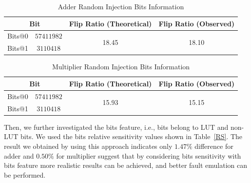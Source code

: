 \begin{table}[tb!]
\center
\caption{Adder Random Injection Bits Information}

\label{RI}

\begin{tabular}{c c  c c   } 
 \hline
\multicolumn{2}{c}{Bit}     & Flip Ratio (Theoretical) &  Flip Ratio (Observed)   \\ 
 \hline
 
 Bits@0 & $57 411 982  $ & \multirow{2}{*}{18.45} & \multirow{2}{*}{18.10} \\
 Bits@1 & $3110418$  & &\\ 
 \hline
% 

 
 
\end{tabular}
\end{table}


\begin{table}[tb!]
\center
\caption{Multiplier Random Injection Bits Information}

\label{RIM}

\begin{tabular}{c c  c c   } 
 \hline
\multicolumn{2}{c}{Bit}     & Flip Ratio (Theoretical) &  Flip Ratio (Observed)   \\ 
 \hline
 
 Bits@0 & $57 411 982  $ & \multirow{2}{*}{15.93} & \multirow{2}{*}{15.15} \\
 Bits@1 & $3110418$  & &\\ 
 \hline
% 

 
 
\end{tabular}
\end{table}





Then, we further investigated the bits feature, i.e., bits belong to LUT and non-LUT bits. We used the bits relative sensitivity values shown in Table~\ref{RS}. The result we obtained by using this approach indicates only $1.47\%$ difference for adder and $0.50\%$ for multiplier suggest that by considering bits sensitivity with bits feature more realistic results can be achieved, and better fault emulation can be performed. 



